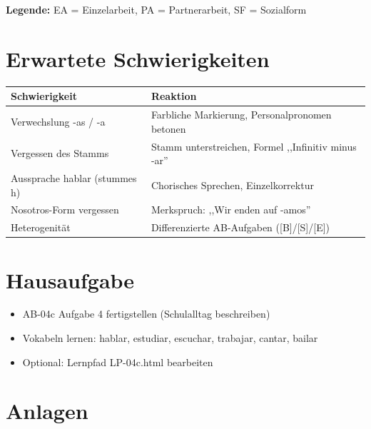 \documentclass[11pt,a4paper]{article}
\begin{document}
\textbf{Legende:} EA = Einzelarbeit, PA = Partnerarbeit, SF = Sozialform

\section{Erwartete Schwierigkeiten}

\begin{tabular}{|p{5cm}|p{8cm}|}
\hline
\textbf{Schwierigkeit} & \textbf{Reaktion} \\
\hline
Verwechslung -as / -a & Farbliche Markierung, Personalpronomen betonen \\
\hline
Vergessen des Stamms & Stamm unterstreichen, Formel ,,Infinitiv minus -ar'' \\
\hline
Aussprache hablar (stummes h) & Chorisches Sprechen, Einzelkorrektur \\
\hline
Nosotros-Form vergessen & Merkspruch: ,,Wir enden auf -amos'' \\
\hline
Heterogenität & Differenzierte AB-Aufgaben ([B]/[S]/[E]) \\
\hline
\end{tabular}

\section{Hausaufgabe}

\begin{itemize}
    \item AB-04c Aufgabe 4 fertigstellen (Schulalltag beschreiben)
    \item Vokabeln lernen: hablar, estudiar, escuchar, trabajar, cantar, bailar
    \item Optional: Lernpfad LP-04c.html bearbeiten
\end{itemize}

\section{Anlagen}
\end{document}
